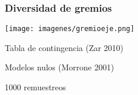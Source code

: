 \documentclass[compress]{beamer}
\begin{document}
{
\begin{frame}
\frametitle{Diversidad de gremios}
\vspace{-0.5cm}

\begin{center}
\texttt{[image: imagenes/gremioeje.png]}
\end{center}
\vspace{-1cm}

\begin{itemize}
\pause
\normalsize{\item Tabla de contingencia (Zar 2010)}
\pause
\normalsize{\item Modelos nulos (Morrone 2001)}
\pause
\normalsize{\item 1000 remuestreos}

\end{itemize}
\end{frame}
}


\end{document}
